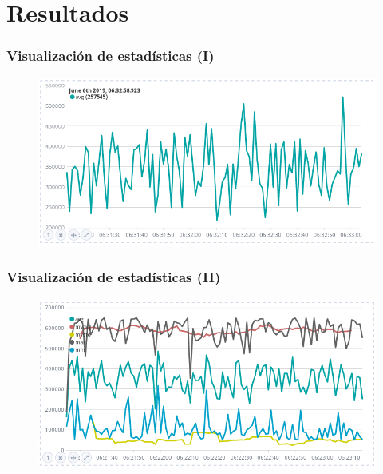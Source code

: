 \documentclass{beamer}
\begin{document}
\section{Resultados}


\begin{frame}
\frametitle{Visualización de estadísticas (I)}

\begin{figure}[H]
	\centering
	\includegraphics[scale=0.5]{timelion-avg.png}
	\label{timelionavg}
\end{figure}

\end{frame}


\begin{frame}
\frametitle{Visualización de estadísticas (II)}

\begin{figure}[H]
	\centering
	\includegraphics[scale=0.5]{timelion-all-stats.png}
	\label{timelion}
\end{figure}

\end{frame}
\end{document}
